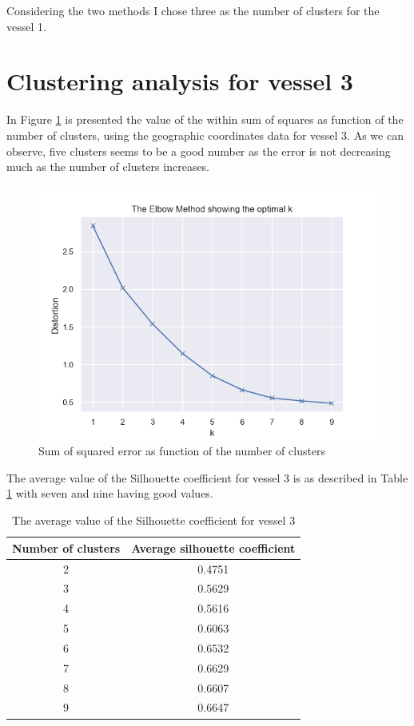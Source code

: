 Considering the two methods I chose three as the number of clusters for the vessel 1.

\section{Clustering analysis for vessel 3} %
\label{sub:clustering_vessel_3}
In Figure \ref{fig:elbow_method_3} is presented the value of the within sum of squares as function of the number of clusters, using the geographic coordinates data for vessel 3. As we can observe, five clusters seems to be a good number as the error is not decreasing much as the number of clusters increases. 


\begin{figure}[]
\centering
\includegraphics[width=0.8\linewidth]{Chapters/img/elbow_method3.png}
\caption{Sum of squared error as function of the number of clusters}
\label{fig:elbow_method_3}
\end{figure}


The average value of the Silhouette coefficient for vessel 3 is as described in Table \ref{table:vessel3_silhouette} with seven and nine having good values.

\begin {table}[H]
\caption {The average value of the Silhouette coefficient for vessel 3}
\begin{center}
\begin{tabular}{c|c}
\textbf{Number of clusters} & \textbf{Average silhouette coefficient}  \\
\hline
2 & 0.4751 \\
3 & 0.5629 \\
4 & 0.5616 \\
5 & 0.6063 \\
6 & 0.6532 \\
7 & 0.6629 \\
8 & 0.6607 \\
9 & 0.6647
\label{table:vessel3_silhouette}
\end{tabular}
\end{center}
\end {table}


